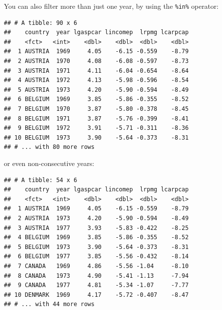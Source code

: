 \documentclass[]{gitbook}
\newenvironment{Shaded}{\begin{snugshade}}{\end{snugshade}}
\newcommand{\DecValTok}[1]{\textcolor[rgb]{0.00,0.00,0.81}{#1}}
\newcommand{\KeywordTok}[1]{\textcolor[rgb]{0.13,0.29,0.53}{\textbf{#1}}}
\newcommand{\NormalTok}[1]{#1}
\newcommand{\OperatorTok}[1]{\textcolor[rgb]{0.81,0.36,0.00}{\textbf{#1}}}
\newcommand{\StringTok}[1]{\textcolor[rgb]{0.31,0.60,0.02}{#1}}
\theoremstyle{definition}
\theoremstyle{definition}
\theoremstyle{definition}
\theoremstyle{remark}
\begin{document}
You can also filter more than just one year, by using the
\texttt{\%in\%} operator:

\begin{Shaded}
\end{Shaded}

\begin{verbatim}
## # A tibble: 90 x 6
##    country  year lgaspcar lincomep  lrpmg lcarpcap
##    <fct>   <int>    <dbl>    <dbl>  <dbl>    <dbl>
##  1 AUSTRIA  1969     4.05    -6.15 -0.559    -8.79
##  2 AUSTRIA  1970     4.08    -6.08 -0.597    -8.73
##  3 AUSTRIA  1971     4.11    -6.04 -0.654    -8.64
##  4 AUSTRIA  1972     4.13    -5.98 -0.596    -8.54
##  5 AUSTRIA  1973     4.20    -5.90 -0.594    -8.49
##  6 BELGIUM  1969     3.85    -5.86 -0.355    -8.52
##  7 BELGIUM  1970     3.87    -5.80 -0.378    -8.45
##  8 BELGIUM  1971     3.87    -5.76 -0.399    -8.41
##  9 BELGIUM  1972     3.91    -5.71 -0.311    -8.36
## 10 BELGIUM  1973     3.90    -5.64 -0.373    -8.31
## # ... with 80 more rows
\end{verbatim}

or even non-consecutive years:

\begin{Shaded}
\end{Shaded}

\begin{verbatim}
## # A tibble: 54 x 6
##    country  year lgaspcar lincomep  lrpmg lcarpcap
##    <fct>   <int>    <dbl>    <dbl>  <dbl>    <dbl>
##  1 AUSTRIA  1969     4.05    -6.15 -0.559    -8.79
##  2 AUSTRIA  1973     4.20    -5.90 -0.594    -8.49
##  3 AUSTRIA  1977     3.93    -5.83 -0.422    -8.25
##  4 BELGIUM  1969     3.85    -5.86 -0.355    -8.52
##  5 BELGIUM  1973     3.90    -5.64 -0.373    -8.31
##  6 BELGIUM  1977     3.85    -5.56 -0.432    -8.14
##  7 CANADA   1969     4.86    -5.56 -1.04     -8.10
##  8 CANADA   1973     4.90    -5.41 -1.13     -7.94
##  9 CANADA   1977     4.81    -5.34 -1.07     -7.77
## 10 DENMARK  1969     4.17    -5.72 -0.407    -8.47
## # ... with 44 more rows
\end{verbatim}
\end{document}
